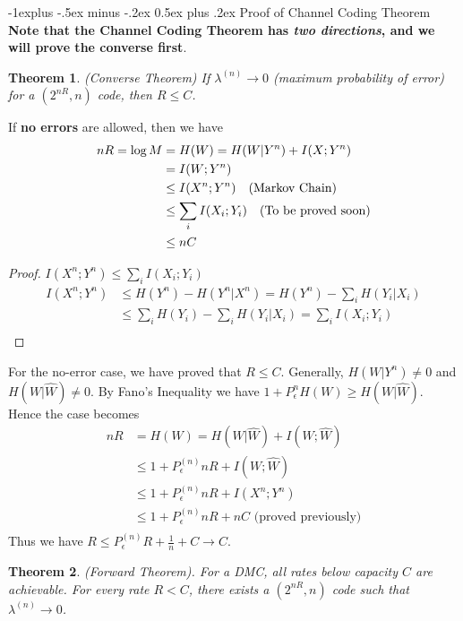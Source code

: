 \documentclass[10pt,landscape, a4paper]{article}
\makeatletter
\newtheorem{theorem}{Theorem}
\renewcommand{\subsection}{\@startsection{subsection}{2}{0mm}%
                                {-1explus -.5ex minus -.2ex}%
                                {0.5ex plus .2ex}%
                                {\normalfont\normalsize\bfseries}}
\makeatother
\begin{document}
\begin{multicols}{3}
\subsection{Proof of Channel Coding Theorem}
\textbf{Note that the Channel Coding Theorem has \textit{two directions}, and we will prove the converse first}.
\begin{theorem}
    (Converse Theorem) If $\lambda^{(n)}\rightarrow 0$ (maximum probability of error) for a $(2^{nR},n)$ code, then $R\le C$.
\end{theorem}
If \textbf{no errors} are allowed, then we have
$$
\begin{aligned}
    nR=\log M&=H(W)=H(W|Y^n)+I(X;Y^n)\\
    &=I(W;Y^n)\\
    &\le I(X^n;Y^n)\text{\quad(Markov Chain)}\\
    &\le \sum_i I(X_i;Y_i) \text{\quad (To be proved soon)}\\
    &\le nC\\
\end{aligned}
$$
\begin{proof} $I(X^n;Y^n)\le \sum_i I(X_i;Y_i)$
    $$
    \begin{aligned}
        I(X^n;Y^n)&\le H(Y^n)-H(Y^n|X^n)=H(Y^n)-\sum_i H(Y_i|X_i)\\
        &\le \sum_i H(Y_i)-\sum_i H(Y_i|X_i)=\sum_i I(X_i;Y_i)\\
    \end{aligned}
    $$
\end{proof}

For the no-error case, we have proved that $R\le C$. Generally, $H(W|Y^n)\ne 0$ and $H(W|\hat{W})\ne 0$. By Fano's Inequality we have $1+P_\epsilon^{n}H(W)\ge H(W|\hat{W})$. Hence the case becomes
$$
\begin{aligned}
    nR&=H(W)=H(W|\hat{W})+I(W;\hat{W})\\
    &\le1+P_\epsilon^{(n)}nR+I(W;\hat{W})\\
    &\le 1+P_\epsilon^{(n)}nR+I(X^n;Y^n)\\
    &\le 1+P_\epsilon^{(n)}nR+nC \text{ (proved previously)}\\
    \end{aligned}
$$
Thus we have $R\le P_\epsilon^{(n)}R+\frac{1}{n}+C\rightarrow C$.

\begin{theorem}
    (Forward Theorem). For a DMC, all rates below capacity $C$ are achievable. For every rate $R<C$, there exists a $(2^{nR},n)$ code such that $\lambda^{(n)}\rightarrow 0$.
\end{theorem}


\end{multicols}
\end{document}

